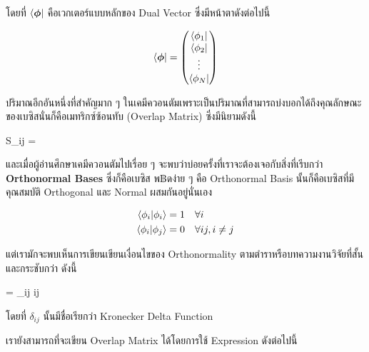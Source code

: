 \noindent โดยที่ $\bra{\boldsymbol \phi}$ คือเวกเตอร์แบบหลักของ Dual Vector ซึ่งมีหน้าตาดังต่อไปนี้

\begin{equation}
    \bra{\boldsymbol \phi}
    =
    \begin{pmatrix}
        \bra{\phi_1} \\
        \bra{\phi_2} \\
        \vdots       \\
        \bra{\phi_N}
    \end{pmatrix}
\end{equation}

ปริมาณอีกอันหนึ่งที่สำคัญมาก ๆ ในเคมีควอนตัมเพราะเป็นปริมาณที่สามารถบ่งบอกได้ถึงคุณลักษณะของเบซิสนั่นก็คือเมทริกซ์ซ้อนทับ (Overlap Matrix)
ซึ่งมีนิยามดังนี้

\begin{tcolorbox}
    S_{ij}
    =
\end{tcolorbox}

\noindent และเมื่อผู้อ่านศึกษาเคมีควอนตัมไปเรื่อย ๆ จะพบว่าบ่อยครั้งที่เราจะต้องเจอกับสิ่งที่เรีบกว่า \textbf{Orthonormal Bases}
ซึ่งก็คือเบซิส พ฿ดง่าย ๆ คือ Orthonormal Basis นั้นก็คือเบซิสที่มีคุณสมบัติ Orthogonal และ Normal ผสมกันอยู่นั่นเอง

\begin{equation}
    \begin{split}
        \braket{\phi_i}{\phi_i} &= 1 \quad \forall i \\
        \braket{\phi_i}{\phi_j} &= 0 \quad \forall ij, i \neq j
    \end{split}
\end{equation}

\noindent แต่เรามักจะพบเห็นการเขียนเขียนเงื่อนไขของ Orthonormality ตามตำราหรือบทความงานวิจัยที่สั้นและกระชับกว่า ดังนี้

\begin{tcolorbox}
    =
    \delta_{ij} \quad \forall ij
\end{tcolorbox}

\noindent โดยที่ $\delta_{ij}$ นั้นมีชื่อเรียกว่า Kronecker Delta Function

เรายังสามารถที่จะเขียน Overlap Matrix ได้โดยการใช้ Expression ดังต่อไปนี้

